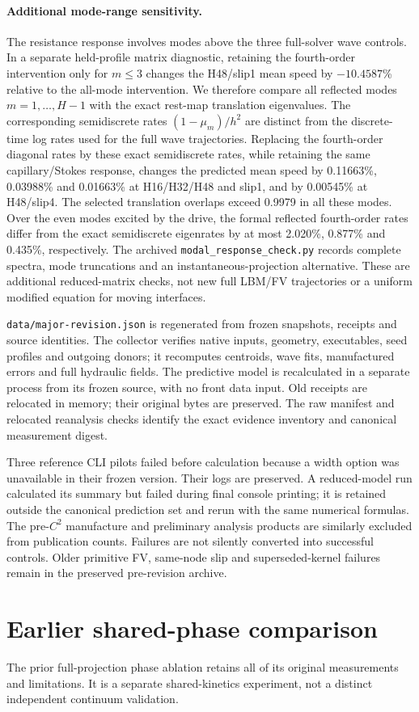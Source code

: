 \paragraph{Additional mode-range sensitivity.}
The resistance response involves modes above the three full-solver wave
controls. In a separate held-profile matrix diagnostic, retaining the
fourth-order intervention only for $m\leq3$ changes the H48/slip1 mean speed
by $-10.4587$\% relative to the all-mode intervention.
We therefore compare all reflected modes $m=1,\ldots,H-1$ with the exact
rest-map translation eigenvalues. The corresponding semidiscrete rates
$(1-\mu_m)/h^2$ are distinct from the discrete-time log rates used for the
full wave trajectories. Replacing the fourth-order diagonal rates by these
exact semidiscrete rates, while retaining the same capillary/Stokes response,
changes the predicted mean speed by 0.11663\%, 0.03988\% and 0.01663\%
at H16/H32/H48 and slip1, and by 0.00545\% at H48/slip4.
The selected translation overlaps exceed 0.9979 in all these modes.
Over the even modes excited by the drive, the formal reflected fourth-order
rates differ from the exact semidiscrete eigenrates by at most 2.020\%,
0.877\% and 0.435\%, respectively.
The archived \texttt{modal\_response\_check.py} records complete spectra,
mode truncations and an instantaneous-projection alternative.
These are additional reduced-matrix checks, not new full LBM/FV trajectories
or a uniform modified equation for moving interfaces.

\texttt{data/major-revision.json} is regenerated from frozen snapshots,
receipts and source identities. The collector verifies native inputs,
geometry, executables, seed profiles and outgoing donors; it recomputes
centroids, wave fits, manufactured errors and full hydraulic fields.
The predictive model is recalculated in a separate process from its frozen
source, with no front data input. Old receipts are relocated in memory;
their original bytes are preserved.
The raw manifest and relocated reanalysis checks identify the exact evidence
inventory and canonical measurement digest.

Three reference CLI pilots failed before calculation because a width option
was unavailable in their frozen version. Their logs are preserved.
A reduced-model run calculated its summary but failed during final console
printing; it is retained outside the canonical prediction set and rerun
with the same numerical formulas. The pre-$C^2$ manufacture and preliminary
analysis products are similarly excluded from publication counts.
Failures are not silently converted into successful controls.
Older primitive FV, same-node slip and superseded-kernel failures remain
in the preserved pre-revision archive.

\section{Earlier shared-phase comparison}
The prior full-projection phase ablation retains all of its original
measurements and limitations. It is a separate shared-kinetics experiment,
not a distinct independent continuum validation.


